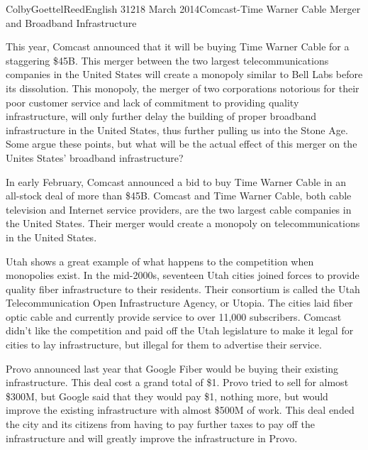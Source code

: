 \documentclass[12pt]{article}
\begin{document}
\begin{mla}{Colby}{Goettel}{Reed}{English 312}{18 March 2014}{Comcast-Time Warner Cable Merger and Broadband Infrastructure}

This year, Comcast announced that it will be buying Time Warner Cable for a staggering \$45B. This merger between the two largest telecommunications companies in the United States will create a monopoly similar to Bell Labs before its dissolution. This monopoly, the merger of two corporations notorious for their poor customer service and lack of commitment to providing quality infrastructure, will only further delay the building of proper broadband infrastructure in the United States, thus further pulling us into the Stone Age. Some argue these points, but what will be the actual effect of this merger on the Unites States' broadband infrastructure?

In early February, Comcast announced a bid to buy Time Warner Cable in an all-stock deal of more than \$45B. Comcast and Time Warner Cable, both cable television and Internet service providers, are the two largest cable companies in the United States. Their merger would create a monopoly on telecommunications in the United States.


Utah shows a great example of what happens to the competition when monopolies exist. In the mid-2000s, seventeen Utah cities joined forces to provide quality fiber infrastructure to their residents. Their consortium is called the Utah Telecommunication Open Infrastructure Agency, or Utopia. The cities laid fiber optic cable and currently provide service to over 11,000 subscribers. Comcast didn't like the competition and paid off the Utah legislature to make it legal for cities to lay infrastructure, but illegal for them to advertise their service.

Provo announced last year that Google Fiber would be buying their existing infrastructure. This deal cost a grand total of \$1. Provo tried to sell for almost \$300M, but Google said that they would pay \$1, nothing more, but would improve the existing infrastructure with almost \$500M of work. This deal ended the city and its citizens from having to pay further taxes to pay off the infrastructure and will greatly improve the infrastructure in Provo.


\end{mla}
\end{document}
